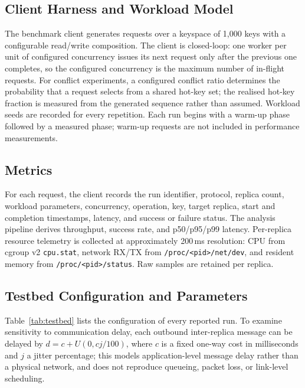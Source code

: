 \subsection{Client Harness and Workload Model}

The benchmark client generates requests over a keyspace of 1{,}000 keys with
a configurable read/write composition. The client is closed-loop: one worker
per unit of configured concurrency issues its next request only after the
previous one completes, so the configured concurrency is the maximum number
of in-flight requests. For conflict experiments, a configured conflict ratio
determines the probability that a request selects from a shared hot-key set;
the realised hot-key fraction is measured from the generated sequence rather
than assumed. Workload seeds are recorded for every repetition. Each run
begins with a warm-up phase followed by a measured phase; warm-up requests
are not included in performance measurements.

\subsection{Metrics}

For each request, the client records the run identifier, protocol, replica
count, workload parameters, concurrency, operation, key, target replica,
start and completion timestamps, latency, and success or failure status.
The analysis pipeline derives throughput, success rate, and p50/p95/p99
latency. Per-replica resource telemetry is collected at approximately
200\,ms resolution: CPU from cgroup v2 \texttt{cpu.stat}, network RX/TX
from \texttt{/proc/<pid>/net/dev}, and resident memory from
\texttt{/proc/<pid>/status}. Raw samples are retained per replica.

\subsection{Testbed Configuration and Parameters}

Table~\ref{tab:testbed} lists the configuration of every reported run. To
examine sensitivity to communication delay, each outbound inter-replica
message can be delayed by $d = c + U(0, cj/100)$, where $c$ is a fixed
one-way cost in milliseconds and $j$ a jitter percentage; this models
application-level message delay rather than a physical network, and does not
reproduce queueing, packet loss, or link-level scheduling.



